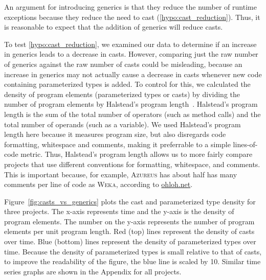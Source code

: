 \documentclass{svjour3}
\newcommand{\azureus}{\textsc{Azureus}\xspace}
\newcommand{\weka}{\textsc{Weka}\xspace}
\begin{document}
An argument for introducing generics is that they
reduce the number of runtime exceptions because they reduce
the need to cast (\autoref{hypo:cast_reduction}).
Thus, it is reasonable to expect that the addition of generics
will reduce casts.

To test \autoref{hypo:cast_reduction}, we examined 
our data to determine if an increase in generics leads to a
decrease in casts.
However, comparing just the raw number of generics against the 
raw number of casts could be misleading, because an increase in 
generics may not actually cause a decrease in casts whenever new 
code containing parameterized types is added.
To control for this, we calculated the density of program elements 
(parameterized types or casts) by dividing the number of 
program elements by Halstead's program length~\cite{halstead}.
Halstead's program length is the sum of the total
number of operators (such as method calls)
and the total number of operands (such as a variable).
We used Halstead's program length here 
because it measures program size, but also  
disregards code formatting, whitespace and comments, making
it preferrable to a simple lines-of-code metric.
Thus, Halstead's program length allows us to more fairly compare 
projects that use different conventions for formatting,
whitespace, and comments.
This is important because, for example, \azureus has about half has many
comments per line of code as \weka, according to \url{ohloh.net}.

Figure~\ref{fig:casts_vs_generics} plots the cast and parameterized type density 
for three projects.
The x-axis represents time and the y-axis is the density of program elements.
The number on the y-axis represents the number of program elements 
per unit program length.  Red (top) lines represent the density of casts over time.
Blue (bottom) lines represent the density of parameterized types over time.
Because the density of parameterized types is small relative to that of casts, 
to improve the readability of the figure, the blue line is scaled by 10.
Similar time series graphs are shown in the Appendix for all projects.
\end{document}
